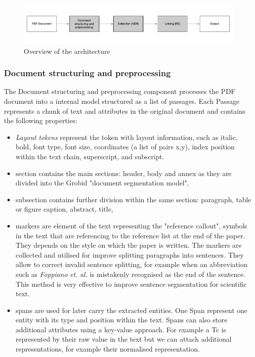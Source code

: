 \documentclass{article}
\begin{document}
\begin{figure}[ht]
\includegraphics[width=\textwidth]{overview-schema}
\caption{Overview of the architecture}
\end{figure}

\subsubsection{Document structuring and preprocessing}
The Document structuring and preprocessing component processes the PDF document into a internal model structured as a list of passages.
Each Passage represents a chunk of text and attributes in the original document and contains the following properties: 
\begin{itemize}
    \item \textit{Layout tokens} represent the token with layout information, such as italic, bold, font type, font size, coordinates (a list of pairs x,y), index position within the text chain, superscript, and subscript. 
    \item section contains the main sections: header, body and annex as they are divided into the Grobid "document segmentation model", 
    \item subsection contains further division within the same section: paragraph, table or figure caption, abstract, title, 
    \item markers are element of the text representing the "reference callout", symbols in the text that are referencing to the reference list at the end of the paper. They depends on the style on which the paper is written. 
    The markers are collected and utilised for improve splitting paragraphs into sentences. They allow to correct invalid sentence splitting, for example when an abbreviation such as \textit{Foppiano et. al.} is mistakenly recognised as the end of the sentence. This method is very effective to improve sentence segmentation for scientific text. 
    \item spans are used for later carry the extracted entities. One Span represent one entity with its type and position within the text. Spans can also store additional attributes using a key-value approach. For example a Tc is represented by their raw value in the text but we can attach additional representations, for example their normalised representation. 
\end{itemize}
\end{document}
